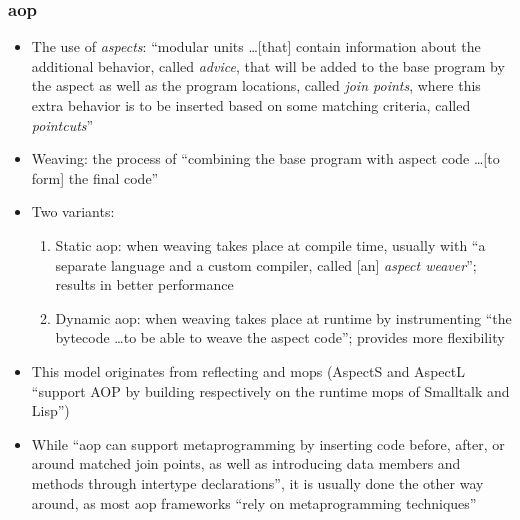 \subsubsection{\acf{aop} \cite[p.~113:11-13]{lilis_survey_2019}}
\begin{itemize}
      \item The use of \emph{aspects}: ``modular units \dots [that] contain
            information about the additional behavior, called \emph{advice},
            that will be added to the base program by the aspect as well as
            the program locations, called \emph{join points}, where this extra
            behavior is to be inserted based on some matching criteria, called
            \emph{pointcuts}'' \cite[p.~113:12]{lilis_survey_2019}
      \item Weaving: the process of ``combining the base program with aspect
            code \dots [to form] the final code'' \cite[p.~113:12]{lilis_survey_2019}
      \item Two variants:
            \begin{enumerate}
                  \item Static \acs{aop}: when weaving takes place at compile
                        time, usually with ``a separate language and a custom
                        compiler, called [an] \emph{aspect weaver}''; results in
                        better performance \cite[p.~113:12]{lilis_survey_2019}
                  \item Dynamic \acs{aop}: when weaving takes place at runtime
                        by instrumenting ``the bytecode \dots to be able to
                        weave the aspect code''; provides more flexibility
                        \cite[p.~113:12]{lilis_survey_2019}
            \end{enumerate}
      \item This model originates from reflecting and \acsp{mop} (AspectS and
            AspectL ``support AOP by building respectively on the runtime
            \acsp{mop} of Smalltalk and Lisp'') \cite[p.~113:12]{lilis_survey_2019}
      \item While ``\acs{aop} can support metaprogramming by inserting code
            before, after, or around matched join points, as well as introducing
            data members and methods through intertype declarations'', it is
            usually done the other way around, as most \acs{aop} frameworks
            ``rely on metaprogramming techniques'' \cite[p.~113:12]{lilis_survey_2019}
\end{itemize}

